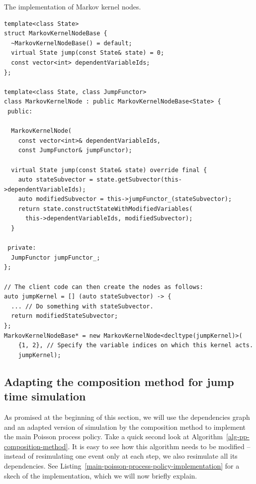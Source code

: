 \documentclass[report.tex]{subfiles}
\begin{document}
\begin{lstfloat}
\caption{The implementation of Markov kernel nodes.}
\label{markov-kernel-nodes-implementation}
\begin{lstlisting}
template<class State>
struct MarkovKernelNodeBase {
  ~MarkovKernelNodeBase() = default;
  virtual State jump(const State& state) = 0;
  const vector<int> dependentVariableIds;
};

template<class State, class JumpFunctor>
class MarkovKernelNode : public MarkovKernelNodeBase<State> {
 public:

  MarkovKernelNode(
    const vector<int>& dependentVariableIds,
    const JumpFunctor& jumpFunctor);

  virtual State jump(const State& state) override final {
    auto stateSubvector = state.getSubvector(this->dependentVariableIds);
    auto modifiedSubvector = this->jumpFunctor_(stateSubvector);
    return state.constructStateWithModifiedVariables(
      this->dependentVariableIds, modifiedSubvector);
  }

 private:
  JumpFunctor jumpFunctor_;
};

// The client code can then create the nodes as follows:
auto jumpKernel = [] (auto stateSubvector) -> {
  ... // Do something with stateSubvector.
  return modifiedStateSubvector;
};
MarkovKernelNodeBase* = new MarkovKernelNode<decltype(jumpKernel)>(
    {1, 2}, // Specify the variable indices on which this kernel acts.
    jumpKernel);

\end{lstlisting}
\end{lstfloat}

\subsection{Adapting the composition method for jump time simulation}

As promised at the beginning of this section, we will use the dependencies graph
and an adapted version of simulation by the composition method to implement
the main Poisson process policy. Take a quick second look at Algorithm~\ref{alg-pp-composition-method}.
It is easy to see how this algorithm needs to be modified -- instead of resimulating
one event only at each step, we also resimulate all its dependencies.
See Listing~\ref{main-poisson-process-policy-implementation} for a skech of the implementation,
which we will now briefly explain.
\end{document}
